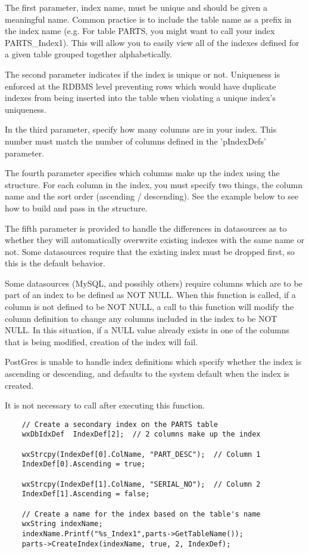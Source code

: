
The first parameter, index name, must be unique and should be given a
meaningful name.  Common practice is to include the table name as a prefix
in the index name (e.g. For table PARTS, you might want to call your index
PARTS\_Index1).  This will allow you to easily view all
of the indexes defined for a given table grouped together alphabetically.

The second parameter indicates if the index is unique or not.  Uniqueness
is enforced at the RDBMS level preventing rows which would have duplicate
indexes from being inserted into the table when violating a unique index's
uniqueness.

In the third parameter, specify how many columns are in your index.  This
number must match the number of columns defined in the 'pIndexDefs' parameter.

The fourth parameter specifies which columns make up the index using the
 structure.  For each column in the index, you must specify two
things, the column name and the sort order (ascending / descending).  See
the example below to see how to build and pass in the  structure.

The fifth parameter is provided to handle the differences in datasources as
to whether they will automatically overwrite existing indexes with the same
name or not.  Some datasources require that the existing index must be dropped
first, so this is the default behavior.

Some datasources (MySQL, and possibly others) require columns which are to be
part of an index to be defined as NOT NULL.  When this function is called, if
a column is not defined to be NOT NULL, a call to this function will modify
the column definition to change any columns included in the index to be
NOT NULL.  In this situation, if a NULL value already exists in one of the
columns that is being modified, creation of the index will fail.

PostGres is unable to handle index definitions which specify whether the index
is ascending or descending, and defaults to the system default when the index
is created.

It is not necessary to call 
after executing this function.


\begin{verbatim}
    // Create a secondary index on the PARTS table
    wxDbIdxDef  IndexDef[2];  // 2 columns make up the index

    wxStrcpy(IndexDef[0].ColName, "PART_DESC");  // Column 1
    IndexDef[0].Ascending = true;

    wxStrcpy(IndexDef[1].ColName, "SERIAL_NO");  // Column 2
    IndexDef[1].Ascending = false;

    // Create a name for the index based on the table's name
    wxString indexName;
    indexName.Printf("%s_Index1",parts->GetTableName());
    parts->CreateIndex(indexName, true, 2, IndexDef);
\end{verbatim}

